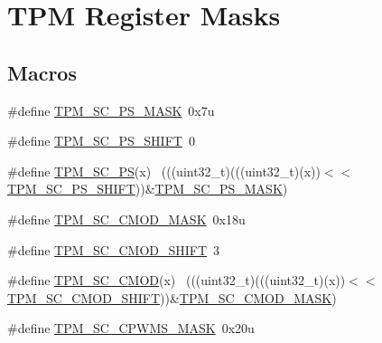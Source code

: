 \hypertarget{group___t_p_m___register___masks}{}\section{T\+PM Register Masks}
\label{group___t_p_m___register___masks}
\subsection*{Macros}
\begin{DoxyCompactItemize}
\item 
\#define \hyperlink{group___t_p_m___register___masks_gab20218cf8b49b4d2aa932cfafdf5a43e}{T\+P\+M\+\_\+\+S\+C\+\_\+\+P\+S\+\_\+\+M\+A\+SK}~0x7u
\item 
\#define \hyperlink{group___t_p_m___register___masks_ga13fca37c98cc93640be8ed1733cb9805}{T\+P\+M\+\_\+\+S\+C\+\_\+\+P\+S\+\_\+\+S\+H\+I\+FT}~0
\item 
\#define \hyperlink{group___t_p_m___register___masks_ga520f51b687e2457fbf2db626afef1038}{T\+P\+M\+\_\+\+S\+C\+\_\+\+PS}(x)                                                      ~(((uint32\+\_\+t)(((uint32\+\_\+t)(x))$<$$<$\hyperlink{group___t_p_m___register___masks_ga13fca37c98cc93640be8ed1733cb9805}{T\+P\+M\+\_\+\+S\+C\+\_\+\+P\+S\+\_\+\+S\+H\+I\+FT}))\&\hyperlink{group___t_p_m___register___masks_gab20218cf8b49b4d2aa932cfafdf5a43e}{T\+P\+M\+\_\+\+S\+C\+\_\+\+P\+S\+\_\+\+M\+A\+SK})
\item 
\#define \hyperlink{group___t_p_m___register___masks_ga86346adaa1aec83adbcf3a21289d6400}{T\+P\+M\+\_\+\+S\+C\+\_\+\+C\+M\+O\+D\+\_\+\+M\+A\+SK}~0x18u
\item 
\#define \hyperlink{group___t_p_m___register___masks_ga9268286302a41feb004444a7b368af69}{T\+P\+M\+\_\+\+S\+C\+\_\+\+C\+M\+O\+D\+\_\+\+S\+H\+I\+FT}~3
\item 
\#define \hyperlink{group___t_p_m___register___masks_ga4a1a5d928f676c977e8e74be89762f59}{T\+P\+M\+\_\+\+S\+C\+\_\+\+C\+M\+OD}(x)                                                  ~(((uint32\+\_\+t)(((uint32\+\_\+t)(x))$<$$<$\hyperlink{group___t_p_m___register___masks_ga9268286302a41feb004444a7b368af69}{T\+P\+M\+\_\+\+S\+C\+\_\+\+C\+M\+O\+D\+\_\+\+S\+H\+I\+FT}))\&\hyperlink{group___t_p_m___register___masks_ga86346adaa1aec83adbcf3a21289d6400}{T\+P\+M\+\_\+\+S\+C\+\_\+\+C\+M\+O\+D\+\_\+\+M\+A\+SK})
\item 
\#define \hyperlink{group___t_p_m___register___masks_ga2ed4f55ed6ec313d2f5c0cef0d9606e7}{T\+P\+M\+\_\+\+S\+C\+\_\+\+C\+P\+W\+M\+S\+\_\+\+M\+A\+SK}~0x20u

\end{DoxyCompactItemize}
